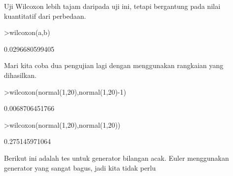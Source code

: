 \documentclass[a4paper,10pt]{article}
\begin{document}
\begin{eulernotebook}
\begin{eulercomment}
\begin{eulercomment}
\begin{eulercomment}
\begin{eulercomment}
\begin{eulercomment}
\begin{eulercomment}
\begin{eulercomment}
\begin{eulercomment}
\begin{eulercomment}
\begin{eulercomment}
\begin{eulercomment}
\begin{eulercomment}
\begin{eulercomment}
\begin{eulercomment}
\begin{eulercomment}
\begin{eulercomment}
\begin{eulercomment}
\begin{eulercomment}
\begin{eulercomment}
\begin{eulercomment}
\begin{eulercomment}
\begin{eulercomment}
\begin{eulercomment}
\begin{eulercomment}
\begin{eulercomment}
\begin{eulercomment}
\begin{eulercomment}
\begin{eulercomment}
\begin{eulercomment}
\begin{eulercomment}
\begin{eulercomment}
\begin{eulercomment}
\begin{eulercomment}
\begin{eulercomment}
\begin{eulercomment}
\begin{eulercomment}
\begin{eulercomment}
\begin{eulercomment}
\begin{eulercomment}
\begin{eulercomment}
\begin{eulercomment}
\begin{eulercomment}
\begin{eulercomment}
\begin{eulercomment}
\begin{eulercomment}
\begin{eulercomment}
\begin{eulercomment}
Uji Wilcoxon lebih tajam daripada uji ini, tetapi bergantung pada
nilai kuantitatif dari perbedaan.
\end{eulercomment}
\begin{eulerprompt}
>wilcoxon(a,b)
\end{eulerprompt}
\begin{euleroutput}
  0.0296680599405
\end{euleroutput}
\begin{eulercomment}
Mari kita coba dua pengujian lagi dengan menggunakan rangkaian yang
dihasilkan.
\end{eulercomment}
\begin{eulerprompt}
>wilcoxon(normal(1,20),normal(1,20)-1)
\end{eulerprompt}
\begin{euleroutput}
  0.0068706451766
\end{euleroutput}
\begin{eulerprompt}
>wilcoxon(normal(1,20),normal(1,20))
\end{eulerprompt}
\begin{euleroutput}
  0.275145971064
\end{euleroutput}
\begin{eulercomment}
Berikut ini adalah tes untuk generator bilangan acak. Euler
menggunakan generator yang sangat bagus, jadi kita tidak perlu

\end{eulercomment}
\end{eulercomment}
\end{eulercomment}
\end{eulercomment}
\end{eulercomment}
\end{eulercomment}
\end{eulercomment}
\end{eulercomment}
\end{eulercomment}
\end{eulercomment}
\end{eulercomment}
\end{eulercomment}
\end{eulercomment}
\end{eulercomment}
\end{eulercomment}
\end{eulercomment}
\end{eulercomment}
\end{eulercomment}
\end{eulercomment}
\end{eulercomment}
\end{eulercomment}
\end{eulercomment}
\end{eulercomment}
\end{eulercomment}
\end{eulercomment}
\end{eulercomment}
\end{eulercomment}
\end{eulercomment}
\end{eulercomment}
\end{eulercomment}
\end{eulercomment}
\end{eulercomment}
\end{eulercomment}
\end{eulercomment}
\end{eulercomment}
\end{eulercomment}
\end{eulercomment}
\end{eulercomment}
\end{eulercomment}
\end{eulercomment}
\end{eulercomment}
\end{eulercomment}
\end{eulercomment}
\end{eulercomment}
\end{eulercomment}
\end{eulercomment}
\end{eulercomment}
\end{eulernotebook}
\end{document}
